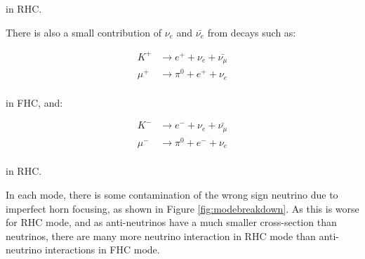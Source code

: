 in RHC. 

There is also a small contribution of $\nu_e$ and $\bar{\nu_e}$ from decays such as:

\begin{equation}
\begin{aligned}
K^{+} &\rightarrow e^+ + \nu_e + \bar{\nu_{\mu}}\\
\mu^{+} &\rightarrow \pi^0 + e^{+} + \nu_e\\
 \end{aligned}
\end{equation}

in FHC, and:

\begin{equation}
\begin{aligned}
K^{-} &\rightarrow e^- + \nu_e + \bar{\nu_{\mu}}\\
\mu^{-} &\rightarrow \pi^0 + e^{-} + \nu_e\\
 \end{aligned}
\end{equation}

in RHC.

In each mode, there is some contamination of the wrong sign neutrino due to imperfect horn focusing, as shown in Figure \ref{fig:modebreakdown}. As this is worse for RHC mode, and as anti-neutrinos have a much smaller cross-section than neutrinos, there are many more neutrino interaction in RHC mode than anti-neutrino interactions in FHC mode.

